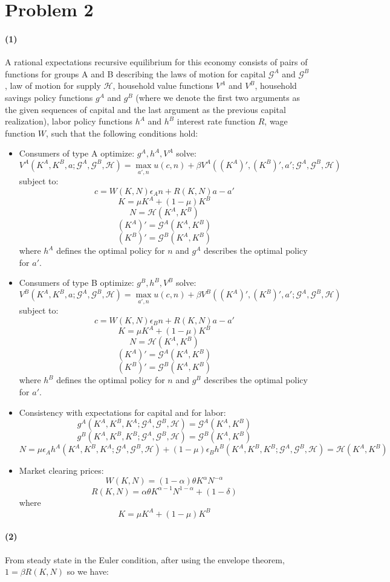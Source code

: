 \documentclass[10pt,letter]{article}
\newcommand{\problem}[1]{\section*{Problem #1}}
\newcommand{\problempart}[1]{\paragraph{#1}}
\begin{document}
\pagebreak
\problem{2}
\problempart{(1)}
A rational expectations recursive equilibrium for this economy consists of pairs of functions for groups A and B describing the laws of motion for capital $\mathcal{G}^A$ and $\mathcal{G}^B$, law of motion for supply $\mathcal{H}$, household value functions $V^A$ and $V^B$, household savings policy functions $g^A$ and $g^B$ (where we denote the first two arguments as the given sequences of capital and the last argument as the previous capital realization), labor policy functions $h^A$ and $h^B$ interest rate function $R$, wage function $W$, such that the following conditions hold:
\begin{itemize}
\item Consumers of type A optimize: $g^A, h^A, V^A$ solve:
\[ V^A(K^A, K^B, a; \mathcal{G}^A, \mathcal{G}^B, \mathcal{H}) = \max_{a', n} u(c, n) + \beta V^A((K^A)', (K^B)', a'; \mathcal{G}^A, \mathcal{G}^B, \mathcal{H}) \]
subject to:
\[ c = W(K, N)\epsilon_A n + R(K, N) a - a' \]
\[ K = \mu K^A + (1-\mu)K^B \]
\[ N = \mathcal{H}(K^A, K^B) \]
\[ (K^A)' = \mathcal{G}^A(K^A, K^B) \]
\[ (K^B)' = \mathcal{G}^B(K^A, K^B) \]
where $h^A$ defines the optimal policy for $n$ and $g^A$ describes the optimal policy for $a'$.
\item Consumers of type B optimize: $g^B, h^B, V^B$ solve:
\[ V^B(K^A, K^B, a; \mathcal{G}^A, \mathcal{G}^B, \mathcal{H}) = \max_{a', n} u(c, n) + \beta V^B((K^A)', (K^B)', a'; \mathcal{G}^A, \mathcal{G}^B, \mathcal{H}) \]
subject to:
\[ c = W(K, N)\epsilon_B n + R(K, N) a - a' \]
\[ K = \mu K^A + (1-\mu)K^B \]
\[ N = \mathcal{H}(K^A, K^B) \]
\[ (K^A)' = \mathcal{G}^A(K^A, K^B) \]
\[ (K^B)' = \mathcal{G}^B(K^A, K^B) \]
where $h^B$ defines the optimal policy for $n$ and $g^B$ describes the optimal policy for $a'$.
\item Consistency with expectations for capital and for labor:
\[ g^A(K^A,K^B, K^A; \mathcal{G}^A,\mathcal{G}^B, \mathcal{H}) = \mathcal{G}^A(K^A, K^B) \]
\[ g^B(K^A,K^B, K^B; \mathcal{G}^A,\mathcal{G}^B, \mathcal{H}) = \mathcal{G}^B(K^A, K^B) \]
\[ N = \mu \epsilon_A h^A(K^A, K^B, K^A; \mathcal{G}^A,\mathcal{G}^B, \mathcal{H}) + (1-\mu) \epsilon_B h^B(K^A, K^B, K^B; \mathcal{G}^A,\mathcal{G}^B, \mathcal{H}) = \mathcal{H}(K^A, K^B) \]
\item Market clearing prices:
\[ W(K, N) = (1-\alpha)\theta K^\alpha N^{-\alpha} \]
\[ R(K, N) = \alpha \theta K^{\alpha-1}N^{1-\alpha} + (1-\delta) \]
where
\[ K = \mu K^A + (1-\mu)K^B \]
\end{itemize}
\problempart{(2)}
From steady state in the Euler condition, after using the envelope theorem, $1 = \beta R(K,N)$ so we have:
\end{document}
